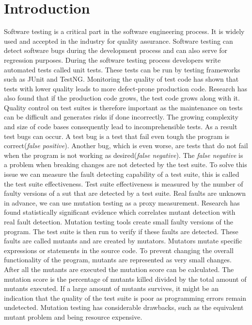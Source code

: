 \documentclass[../main]{subfiles}
\begin{document}
\chapter{Introduction}
\label{ch:introduction}
Software testing is a critical part in the software engineering process. It is widely used and accepted in the industry for quality assurance. 
Software testing can detect software bugs during the development process and can also serve for regression purposes\cite{Bertolino2007SoftwareDreams}. 
During the software testing process developers write automated tests called unit tests. 
These tests can be run by testing frameworks such as JUnit and TestNG\cite{JUnit, TestNG}.
Monitoring the quality of test code has shown that tests with lower quality leads to more defect-prone production code\cite{Spadini2018OnQuality}. 
Research has also found that if the production code grows, the test code grows along with it\cite{Zaidman2008MiningCode}. 
Quality control on test suites is therefore important as the maintenance on tests can be difficult and generates risks if done incorrectly\cite{Horvath2015TestMetrics}.
\newline
The growing complexity and size of code bases consequently lead to incomprehensible tests.
As a result test bugs can occur. 
A test bug is a test that fail even tough the program is correct(\textit{false positive}). 
Another bug, which is even worse, are tests that do not fail when the program is not working as desired(\textit{false negative}).
The \textit{false negative} is a problem when breaking changes are not detected by the test suite.
\newline
To solve this issue we can measure the fault detecting capability of a test suite, this is called the test suite effectiveness.
Test suite effectiveness is measured by the number of faulty versions of a \acrfull{sut} that are detected by a test suite.
Real faults are unknown in advance, we can use mutation testing as a proxy measurement. 
Research has found statistically significant evidence which correlates mutant detection with real fault detection\cite{Just2014AreTesting}.
\newline
Mutation testing tools create small faulty versions of the program.
The test suite is then run to verify if these faults are detected.
These faults are called mutants and are created by mutators.
Mutators mutate specific expressions or statements in the source code. 
To prevent changing the overall functionality of the program, mutants are represented as very small changes\cite{Lipton1978HintsProgrammer}.
\newline
After all the mutants are executed the mutation score can be calculated. 
The mutation score is the percentage of mutants killed divided by the total amount of mutants executed.
If a large amount of mutants survives, it might be an indication that the quality of the test suite is poor as programming errors remain undetected.
Mutation testing has considerable drawbacks, such as the equivalent mutant problem and being resource expensive.
\end{document}
